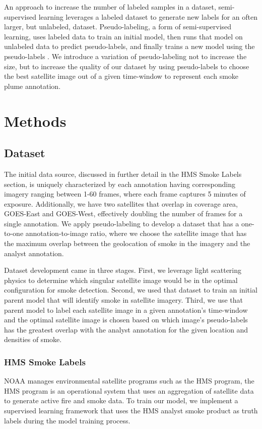 \documentclass{article}
\begin{document}
An approach to increase the number of labeled samples in a dataset, semi-supervised learning leverages a labeled dataset to generate new labels for an often larger, but unlabeled, dataset. Pseudo-labeling, a form of semi-supervised learning, uses labeled data to train an initial model, then runs that model on unlabeled data to predict pseudo-labels, and finally trains a new model using the pseudo-labels \cite{pseudo}. We introduce a variation of pseudo-labeling not to increase the size, but to increase the quality of our dataset by using pseudo-labels to choose the best satellite image out of a given time-window to represent each smoke plume annotation.


\section{Methods}
\subsection*{Dataset}

The initial data source, discussed in further detail in the HMS Smoke Labels section, is uniquely characterized by each annotation having corresponding imagery ranging between 1-60 frames, where each frame captures 5 minutes of exposure.  Additionally, we have two satellites that overlap in coverage area, GOES-East and GOES-West, effectively doubling the number of frames for a single annotation. We apply pseudo-labeling to develop a dataset that has a one-to-one annotation-to-image ratio, where we choose the satellite image that has the maximum overlap between the geolocation of smoke in the imagery and the analyst annotation.

Dataset development came in three stages. First, we leverage light scattering physics to determine which singular satellite image would be in the optimal configuration for smoke detection. Second, we used that dataset to train an initial parent model that will identify smoke in satellite imagery. Third, we use that parent model to label each satellite image in a given annotation's time-window and the optimal satellite image is chosen based on which image's pseudo-labels has the greatest overlap with the analyst annotation for the given location and densities of smoke.

\subsubsection*{HMS Smoke Labels} 
NOAA manages environmental satellite programs such as the HMS program, the HMS program is an operational system that uses an aggregation of satellite data to generate active fire and smoke data. To train our model, we implement a supervised learning framework that uses the HMS analyst smoke product as truth labels during the model training process.
\end{document}
